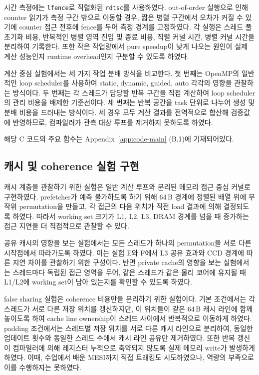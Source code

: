 \documentclass[11pt,a4paper]{article}
\begin{document}
시간 측정에는 \texttt{lfence}로 직렬화된 \texttt{rdtsc}를 사용하였다. out-of-order 실행으로 인해 counter 읽기가 측정 구간 밖으로 이동할 경우, 짧은 병렬 구간에서 오차가 커질 수 있기에 counter 접근 전후에 fence를 두어 측정 경계를 고정하였다. 각 실행은 스레드 풀 초기화 비용, 반복적인 병렬 영역 진입 및 종료 비용, 직렬 커널 시간, 병렬 커널 시간을 분리하여 기록한다. 또한 작은 작업량에서 pure speedup이 낮게 나오는 원인이 실제 계산 성능인지 runtime overhead인지 구분할 수 있도록 하였다.

계산 중심 실험에서는 세 가지 작업 분배 방식을 비교한다. 첫 번째는 OpenMP의 일반적인 loop scheduler를 사용하여 static, dynamic, guided, auto 각각의 영향을 관찰하는 방식이다. 두 번째는 각 스레드가 담당할 반복 구간을 직접 계산하여 loop scheduler의 관리 비용을 배제한 기준선이다. 세 번째는 반복 공간을 task 단위로 나누어 생성 및 분배 비용을 드러내는 방식이다. 세 경우 모두 계산 결과를 전역적으로 합산해 검증값에 반영하므로, 컴파일러가 관측 대상 루프를 제거하지 못하도록 하였다.

해당 C 코드의 주요 함수는 Appendix~\ref{app:code-main} (B.1)에 기재되어있다.

\subsection{캐시 및 coherence 실험 구현}

캐시 계층을 관찰하기 위한 실험은 일반 계산 루프와 분리된 메모리 접근 중심 커널로 구현하였다. prefetcher가 예측 불가하도록 하기 위해 64\,B 경계에 정렬된 배열 위에 무작위 permutation을 만들고, 각 접근의 다음 위치가 직전 load 결과에 의해 결정되도록 하였다. 따라서 working set 크기가 L1, L2, L3, DRAM 경계를 넘을 때 증가하는 접근 지연을 더 직접적으로 관찰할 수 있다.

공유 캐시의 영향을 보는 실험에서는 모든 스레드가 하나의 permutation을 서로 다른 시작점에서 따라가도록 하였다. 이는 실험 E와 F에서 L3 공유 효과와 CCD 경계에 따른 지연 차이를 관찰하기 위한 구성이다. 반면 private cache의 영향을 보는 실험에서는 스레드마다 독립된 접근 영역을 두어, 같은 스레드가 같은 물리 코어에 유지될 때 L1/L2에 working set이 남아 있는지를 확인할 수 있도록 하였다.

false sharing 실험은 coherence 비용만을 분리하기 위한 실험이다. 기본 조건에서는 각 스레드가 서로 다른 저장 위치를 갱신하지만, 이 위치들이 같은 64\,B 캐시 라인에 함께 놓이도록 하여 cache line ownership이 스레드 사이에서 반복적으로 이동하게 하였다. padding 조건에서는 스레드별 저장 위치를 서로 다른 캐시 라인으로 분리하여, 동일한 업데이트 횟수와 동일한 스레드 수에서 캐시 라인 공유만 제거하였다. 또한 반복 갱신이 컴파일러에 의해 레지스터 누적으로 축약되지 않도록 실제 메모리 write가 발생하게 하였다. 이때, 수업에서 배운 MESI까지 직접 트래킹도 시도하였으나, 역량의 부족으로 이를 수행하지는 못하였다. 
\end{document}
